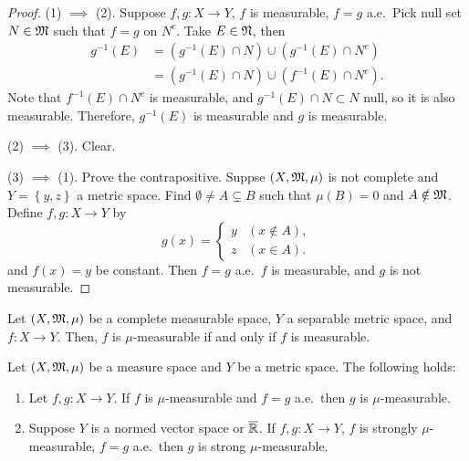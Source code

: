 \documentclass[a4paper]{article}
\begin{document}
\begin{proof}

  (1) $\implies$ (2). Suppose $f, g: X \to Y$, $f$ is measurable,
  $f = g$ a.e.\ Pick null set $N \in \mathfrak{M}$ such that
  $f = g$ on $N^c$. Take $E \in \mathfrak{N}$, then
  \[
    \begin{aligned}
      g^{-1}(E)
       & = (g^{-1}(E) \cap N) \cup (g^{-1} (E) \cap N^c)  \\
       & = (g^{-1}(E) \cap N) \cup (f^{-1} (E) \cap N^c).
    \end{aligned}
  \]
  Note that $f^{-1}(E) \cap N^c$ is measurable, and $g^{-1}(E) \cap N
  \subset N$ null, so it is also measurable. Therefore, $g^{-1}(E)$ is
  measurable and $g$ is measurable.

  (2) $\implies$ (3). Clear.

  (3) $\implies$ (1). Prove the contrapositive.
  Suppse $(X, \mathfrak{M}, \mu)$ is not complete and
  $Y = \left\{ y, z \right\}$ a metric space.
  Find $\emptyset \neq A \subsetneq B$ such that
  $\mu(B) = 0$ and $A \notin \mathfrak{M}$. Define $f, g :
    X \to Y$ by
  \[
    g(x) = \begin{cases}
      y & (x \notin A), \\
      z & (x \in A).
    \end{cases}
  \]
  and $f(x) = y$ be constant. Then $f = g$ a.e.\, $f$ is measurable, and
  $g$ is not measurable.

\end{proof}

\begin{cor}
  Let $(X, \mathfrak{M}, \mu)$ be a complete measurable space,
  $Y$ a separable metric space, and $f: X \to Y$.
  Then, $f$ is $\mu$-measurable if and only if
  $f$ is measurable.
\end{cor}

\begin{prop}
  Let $(X, \mathfrak{M}, \mu)$ be a measure space and $Y$ be a metric space. The
  following holds:
  \begin{enumerate}
    \item Let $f, g: X \to Y$. If $f$ is $\mu$-measurable and $f = g$
          a.e.\, then $g$ is $\mu$-measurable.

    \item Suppose $Y$ is a normed vector space or $\overline{\mathbb{R}}$. If $f, g: X
          \to Y$, $f$ is strongly $\mu$-measurable, $f = g$ a.e.\, then
          $g$ is strong $\mu$-measurable.
  \end{enumerate}
\end{prop}
\end{document}
